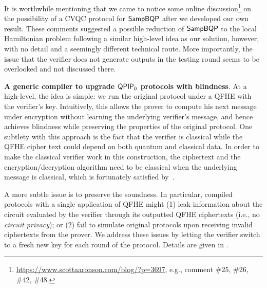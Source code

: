 It is worthwhile mentioning that we came to notice some online discussion\footnote{\url{https://www.scottaaronson.com/blog/?p=3697}, e.g., comment \#25, \#26, \#42, \#48. } on the possibility of a CVQC protocol for $\operatorname{\mathsf{SampBQP}}$ after we developed our own result. 
These comments suggested a possible reduction of $\operatorname{\mathsf{SampBQP}}$ to the local Hamiltonian problem following a similar high-level idea as our solution, however, with no detail and a seemingly different technical route. More importantly, the issue that the verifier does not generate outputs in the testing round seems to be overlooked and not discussed there.

\vspace{2mm} \noindent \textbf{A generic compiler to upgrade $\operatorname{\mathsf{QPIP}}_0$ protocols with blindness}. At a high-level, the idea is simple: we run the original protocol under a QFHE with the verifier's key. Intuitively, this allows the prover to compute his next message under encryption without learning the underlying verifier's message, and hence achieves blindness while preserving the properties of the original protocol.
One subtlety with this approach is the fact that the verifier is classical while the QFHE cipher text could depend on both quantum and classical data.
In order to make the classical verifier work in this construction, the ciphertext and the encryption/decryption algorithm need to be classical when the underlying message is classical, which is fortunately satisfied by~\cite{mahadev_qfhe}.

A more subtle issue is to preserve the soundness.
In particular, compiled protocols with a single application of QFHE might (1) leak information about the circuit evaluated by the verifier through its outputted QFHE ciphertexts (i.e., no \emph{circuit privacy});
or (2) fail to simulate original protocols upon receiving invalid ciphertexts from the prover.
We address these issues by letting the verifier switch to a fresh new key for each round of the protocol. 
Details are given in .

\fi


